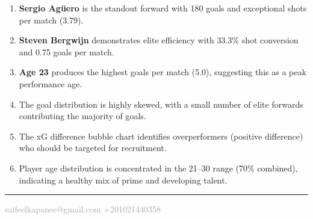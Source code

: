 \documentclass[12pt,a4paper]{article}
\begin{document}
\begin{tcolorbox}[colback=lightgray, colframe=primary, arc=5pt, boxrule=1.5pt]
\begin{enumerate}[leftmargin=1.2cm, label=\textcolor{accent}{\textbf{\arabic*.}}]
    \item \textbf{Sergio Agüero} is the standout forward with 180 goals and exceptional shots per match (3.79).
    \item \textbf{Steven Bergwijn} demonstrates elite efficiency with 33.3\% shot conversion and 0.75 goals per match.
    \item \textbf{Age 23} produces the highest goals per match (5.0), suggesting this as a peak performance age.
    \item The goal distribution is highly skewed, with a small number of elite forwards contributing the majority of goals.
    \item The xG difference bubble chart identifies overperformers (positive difference) who should be targeted for recruitment.
    \item Player age distribution is concentrated in the 21–30 range (70\% combined), indicating a healthy mix of prime and developing talent.
\end{enumerate}
\end{tcolorbox}

\vspace{0.5cm}

\begin{center}
\textcolor{primary}{\rule{0.7\textwidth}{0.5pt}}
\end{center}

\begin{center}
\textcolor{darkgray}{\small \faEnvelope\hspace{0.2cm} saifeelkapanee@gmail.com \hspace{0.5cm} \faPhone\hspace{0.2cm} +201021440358}
\end{center}
\end{document}
